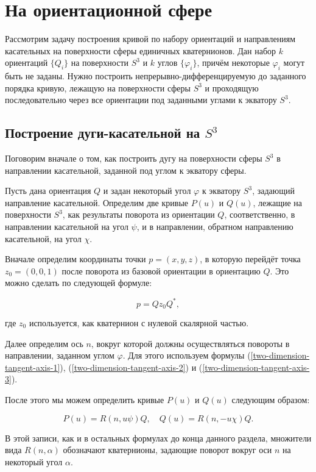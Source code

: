 \section{На ориентационной сфере}

Рассмотрим задачу построения кривой по набору ориентаций и направлениям касательных на поверхности сферы единичных
кватернионов. Дан набор $k$ ориентаций $\{Q_i\}$ на поверхности $S^3$ и $k$ углов $\{\varphi_i\}$, причём некоторые
$\varphi_i$ могут быть не заданы. Нужно построить непрерывно-дифференцируемую до заданного порядка кривую, лежащую
на поверхности сферы $S^3$ и проходящую последовательно через все ориентации под заданными углами к экватору $S^3$.

\subsection*{Построение дуги-касательной на $S^3$}

Поговорим вначале о том, как построить дугу на поверхности сферы $S^3$ в направлении касательной, заданной под углом к
экватору сферы.

Пусть дана ориентация $Q$ и задан некоторый угол $\varphi$ к экватору $S^3$, задающий направление касательной.
Определим две кривые $P(u)$ и $Q(u)$, лежащие на поверхности $S^3$, как результаты поворота из ориентации $Q$,
соответственно, в направлении касательной на угол $\psi$, и в направлении, обратном направлению касательной,
на угол $\chi$.

Вначале определим координаты точки $p=(x,y,z)$, в которую перейдёт точка $z_0=(0,0,1)$ после поворота из базовой
ориентации в ориентацию $Q$. Это можно сделать по следующей формуле:

$$
p=Qz_0Q^*,
$$

\noindent где $z_0$ используется, как кватернион с нулевой скалярной частью.

Далее определим ось $n$, вокруг которой должны осуществляться повороты в направлении, заданном углом $\varphi$. Для этого
используем формулы (\ref{two-dimension-tangent-axis-1}), (\ref{two-dimension-tangent-axis-2}) и
(\ref{two-dimension-tangent-axis-3}).

После этого мы можем определить кривые $P(u)$ и $Q(u)$ следующим образом:

$$
P(u)=R(n,u\psi)Q, \quad Q(u)=R(n,-u\chi)Q.
$$

В этой записи, как и в остальных формулах до конца данного раздела, множители вида $R(n,\alpha)$ обозначают кватернионы,
задающие поворот вокруг оси $n$ на некоторый угол $\alpha$.

